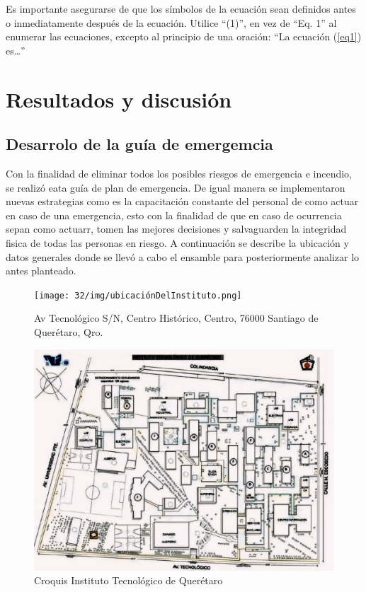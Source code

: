     Es importante asegurarse de que los símbolos de la ecuación sean definidos antes o inmediatamente después de la ecuación. Utilice “(1)”, en vez de “Eq. 1” al enumerar las ecuaciones, excepto al principio de una oración: “La ecuación (\ref{eq1}) es…”
    
    \section{Resultados y discusión}
    \subsection{Desarrolo de la guía de emergemcia}
    
    Con la finalidad de eliminar todos los posibles riesgos de emergencia e incendio, se realizó eata guía de plan de emergencia. De igual manera se implementaron nuevas estrategias como es la capacitación constante del personal de como actuar en caso de una emergencia, esto con la finalidad de que en caso de ocurrencia sepan como actuarr, tomen las mejores decisiones y salvaguarden la integridad fisica de todas las personas en riesgo. 
    A continuación se describe la ubicación y datos generales donde se llevó a cabo el ensamble para posteriormente analizar lo antes planteado.
    \begin{figure}[H]
        \centering
        \texttt{[image: 32/img/ubicaciónDelInstituto.png]}
        \caption{Av Tecnológico S/N, Centro Histórico, Centro, 76000 Santiago de Querétaro, Qro.}
        \label{fig:enter-label}
    \end{figure}
    \begin{figure}[H]
        \centering
        \includegraphics[scale=0.2]{32/img/croquisITQ.jpg}
        \caption{Croquis Instituto Tecnológico de Querétaro}
        \label{fig:enter-label}
    \end{figure}
